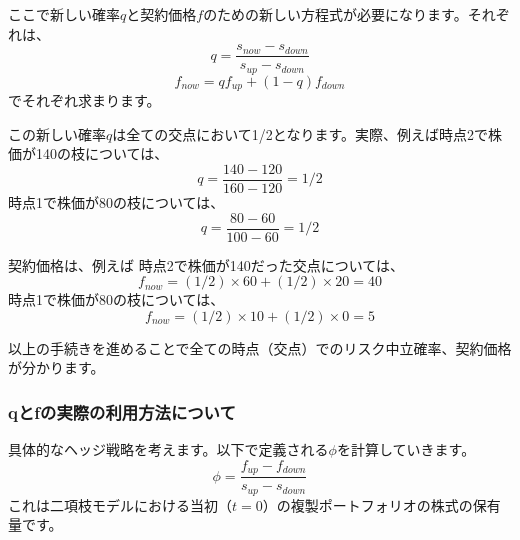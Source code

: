 \documentclass[uplatex,a4j,12pt,dvipdfmx]{jsarticle}
\begin{document}
ここで新しい確率$q$と契約価格$f$のための新しい方程式が必要になります。それぞれは、
\[q = \frac{s_{now} - s_{down}}{s_{up} - s_{down}}\]
\[f_{now} = qf_{up} + (1-q)f_{down}\]
でそれぞれ求まります。

この新しい確率$q$は全ての交点において1/2となります。実際、例えば時点2で株価が140の枝については、
\[q = \frac{140 - 120}{160 - 120} = 1/2\]
時点1で株価が80の枝については、
\[q = \frac{80 - 60}{100 - 60} = 1/2\]

契約価格は、例えば
時点2で株価が140だった交点については、
\[f_{now} = (1/2) \times 60 + (1/2) \times 20 = 40\]
時点1で株価が80の枝については、
\[f_{now} = (1/2) \times 10 + (1/2) \times 0 = 5\]

以上の手続きを進めることで全ての時点（交点）でのリスク中立確率、契約価格が分かります。

\subsubsection{qとfの実際の利用方法について}
具体的なヘッジ戦略を考えます。以下で定義される$\phi$を計算していきます。
\[\phi = \frac{f_{up} - f_{down}}{s_{up} - s_{down}}\]
これは二項枝モデルにおける当初（$t=0$）の複製ポートフォリオの株式の保有量です。
\end{document}
